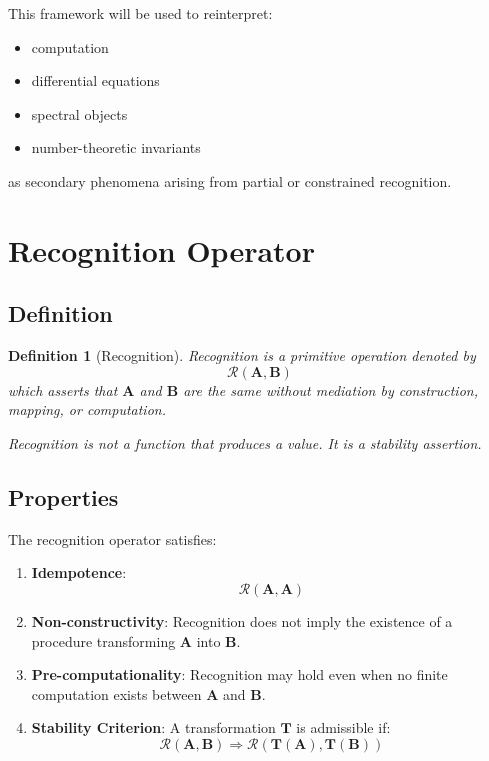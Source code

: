 \documentclass[12pt, oneside]{article}
\newtheorem{definition}[theorem]{Definition}
\newcommand{\R}{\mathcal{R}}
\begin{document}
This framework will be used to reinterpret:
\begin{itemize}
    \item computation
    \item differential equations
    \item spectral objects
    \item number-theoretic invariants
\end{itemize}
as secondary phenomena arising from partial or constrained recognition.

\section{Recognition Operator}

\subsection{Definition}

\begin{definition}[Recognition]
Recognition is a primitive operation denoted by
\begin{equation}
\R(\mathbf{A},\mathbf{B})
\end{equation}
which asserts that $\mathbf{A}$ and $\mathbf{B}$ are the same without mediation by construction, mapping, or computation.

Recognition is not a function that produces a value. It is a stability assertion.
\end{definition}

\subsection{Properties}

The recognition operator satisfies:

\begin{enumerate}
    \item \textbf{Idempotence}:
    \begin{equation}
    \R(\mathbf{A},\mathbf{A})
    \end{equation}
    
    \item \textbf{Non-constructivity}: Recognition does not imply the existence of a procedure transforming $\mathbf{A}$ into $\mathbf{B}$.
    
    \item \textbf{Pre-computationality}: Recognition may hold even when no finite computation exists between $\mathbf{A}$ and $\mathbf{B}$.
    
    \item \textbf{Stability Criterion}: A transformation $\mathbf{T}$ is admissible if:
    \begin{equation}
    \R(\mathbf{A},\mathbf{B}) \Rightarrow \R(\mathbf{T}(\mathbf{A}),\mathbf{T}(\mathbf{B}))
    \end{equation}
\end{enumerate}
\end{document}
